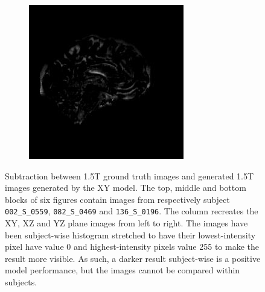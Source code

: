 \documentclass[12pt, fleqn, titlepage]{article}
\newcommand\skipperer{0.45pt}
\newcommand{\1}[1]{\mathds{1}\left[#1\right]}
\begin{document}
\begin{figure}[H]
\begin{subfigure}[b]{0.8\textwidth}
		\hskip\skipperer
		\includegraphics[width=0.22\linewidth]{imgs/subtracted_images/xy/136_S_0196_yz_1.5_1.5gen_comparison}
	\end{subfigure}
	\caption{Subtraction between 1.5T ground truth images and generated 1.5T images generated by the XY model. The top, middle and bottom blocks of six figures contain images from respectively subject \texttt{002\_S\_0559}, \texttt{082\_S\_0469} and \texttt{136\_S\_0196}. The column recreates the XY, XZ and YZ plane images from left to right. The images have been subject-wise histogram stretched to have their lowest-intensity pixel have value 0 and highest-intensity pixels value 255 to make the result more visible. As such, a darker result subject-wise is a positive model performance, but the images cannot be compared within subjects.}
	\label{fig:xy_subtracted_images}
\end{figure}
\end{document}
